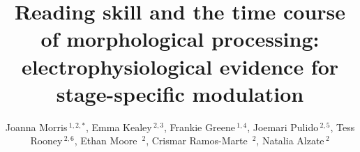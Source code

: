 \documentclass[utf8]{FrontiersinHarvard} %
\def\firstAuthorLast{Morris {et~al.}} %
\def\Authors{Joanna Morris\,$^{1,2,*}$, Emma Kealey\,$^{2,3}$, Frankie Greene\,$^{1,4}$, Joemari Pulido\,$^{2,5}$, Tess Rooney\,$^{2,6}$, Ethan Moore\, $^{2}$, Crismar Ramos-Marte\, $^{2}$, Natalia Alzate\,$^{2}$}
\begin{document}
	\onecolumn
	
	\title[Running Title]{Reading skill and the time course of morphological processing: electrophysiological evidence for stage-specific modulation} 
	
	\author[\firstAuthorLast ]{\Authors} %
	\address{} %
	\correspondance{} %
	
	\extraAuth{}%
	
	
	\maketitle
	
	
	
\end{document}
